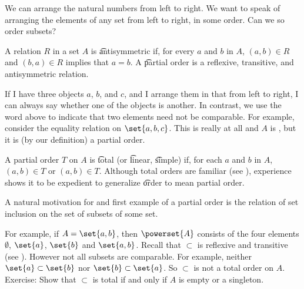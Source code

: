 

We can arrange the natural numbers from left to right.
We want to speak of arranging the elements of any set from left to right, in some order.
Can we so order subsets?


A relation $R$ in a set $A$ is \t{antisymmetric} if, for every $a$ and $b$ in $A$, $(a, b) \in R$ and $(b, a) \in R$ implies that $a = b$.
A \t{partial order} is a reflexive, transitive, and antisymmetric relation.

If I have three objects $a$, $b$, and $c$, and I arrange them in that  from left to right, I can always say whether one of the objects is  another.
In contrast, we use the word   above to indicate that two elements need not be comparable.
For example, consider the equality relation on $\set{a, b, c}$.
This is really  at all and $A$ is , but it is (by our definition) a partial order.

A partial order $T$ on $A$ is \t{total} (or \t{linear}, \t{simple}) if, for each $a$ and $b$ in $A$, $(a, b) \in T$ or $(a, b) \in T$.
Although total orders are familiar (see ), experience shows it to be expedient to generalize \t{order} to mean partial order.



A natural motivation for and first example of a partial order is the relation of set inclusion on the set of subsets of some set.

For example, if $A = \set{a, b}$, then $\powerset{A}$ consists of the four elements $\emptyset$, $\set{a}$, $\set{b}$ and $\set{a,b}$.
Recall that $\subset$ is reflexive and transitive (see ).
However not all subsets are comparable.
For example, neither $\set{a} \subset \set{b}$ nor $\set{b} \subset \set{a}$.
So $\subset$ is not a total order on $A$.
Exercise: Show that $\subset$ is total if and only if $A$ is empty or a singleton.


%



